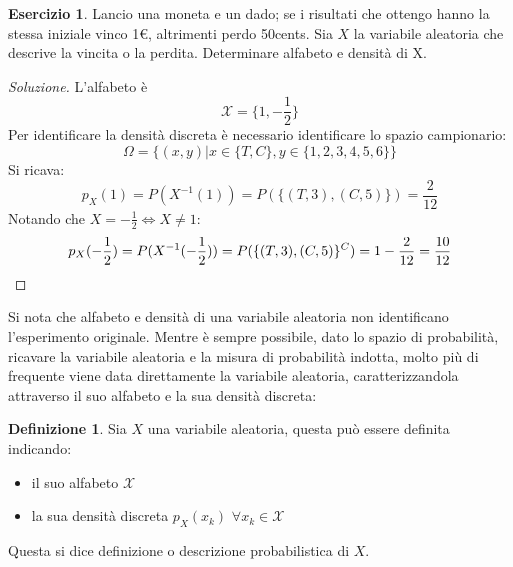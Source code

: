 \documentclass{article}
\theoremstyle{plain}
\theoremstyle{definition}
\newtheorem{definizione}{Definizione}[section]
\newtheorem{esercizio}{Esercizio}[section]
\theoremstyle{remark}
\newenvironment{soluzione}
	{\renewcommand\qedsymbol{$\mathwitch*$}\begin{proof}[Soluzione]}
	{\end{proof}}
\renewcommand{\qedsymbol}{$\mathrightghost$}
\begin{document}
\begin{esercizio}
	Lancio una moneta e un dado; se i risultati che ottengo hanno la stessa iniziale vinco 1€, altrimenti perdo 50cents. Sia $X$ la variabile aleatoria che descrive la vincita o la perdita. Determinare alfabeto e densità di X.
	\begin{soluzione}
		L'alfabeto è
		\begin{equation*}
			\mathcal{X}=\{1,-\frac{1}{2}\}
		\end{equation*}
		Per identificare la densità discreta è necessario identificare lo spazio campionario:
		\begin{equation*}
			\Omega=\{(x,y)|x\in\{T,C\}, y\in\{1,2,3,4,5,6\}\}
		\end{equation*}
		Si ricava:
		\begin{equation*}
			p_X(1)=P(X^{-1}(1))=P(\{(T,3),(C,5)\})=\frac{2}{12}
		\end{equation*}
		Notando che $X=-\frac{1}{2}\Leftrightarrow X\neq 1$:
		\begin{equation*}
			p_X(-\frac{1}{2})=P(X^{-1}(-\frac{1}{2}))=P(\{(T,3),(C,5)\}^C)=1-\frac{2}{12}=\frac{10}{12}\qedhere
		\end{equation*}
	\end{soluzione}
\end{esercizio}
Si nota che alfabeto e densità di una variabile aleatoria non identificano l'esperimento originale. Mentre è sempre possibile, dato lo spazio di probabilità, ricavare la variabile aleatoria e la misura di probabilità indotta, molto più di frequente viene data direttamente la variabile aleatoria, caratterizzandola attraverso il suo alfabeto e la sua densità discreta:
\begin{definizione}
	Sia $X$ una variabile aleatoria, questa può essere definita indicando:
	\begin{itemize}
		\item il suo alfabeto $\mathcal{X}$
		\item la sua densità discreta $p_X(x_k)$ $\forall x_k\in\mathcal{X}$
	\end{itemize}
	Questa si dice definizione o descrizione probabilistica di $X$.
\end{definizione}
\end{document}
